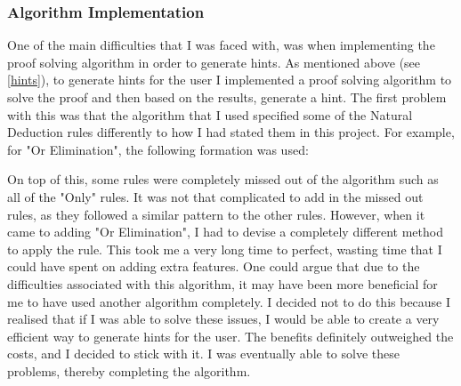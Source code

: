 \subsubsection{Algorithm Implementation}
One of the main difficulties that I was faced with, was when implementing the proof solving algorithm in order to generate hints. As mentioned above (see \ref{hints}), to generate hints for the user I implemented a proof solving algorithm to solve the proof and then based on the results, generate a hint. The first problem with this was that the algorithm that I used specified some of the Natural Deduction rules differently to how I had stated them in this project. For example, for "Or Elimination", the following formation was used:

	\begin{figure}[!ht]
		\centering
	\begin{bprooftree}
	\end{bprooftree}
	\end{figure}

 On top of this, some rules were completely missed out of the algorithm such as all of the "Only" rules. It was not that complicated to add in the missed out rules, as they followed a similar pattern to the other rules. However, when it came to adding "Or Elimination", I had to devise a completely different method to apply the rule. This took me a very long time to perfect, wasting time that I could have spent on adding extra features. One could argue that due to the difficulties associated with this algorithm, it may have been more beneficial for me to have used another algorithm completely. I decided not to do this because I realised that if I was able to solve these issues, I would be able to create a very efficient way to generate hints for the user. The benefits definitely outweighed the costs, and I decided to stick with it. I was eventually able to solve these problems, thereby completing the algorithm. 

